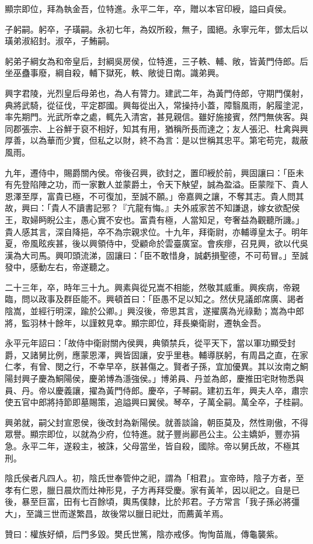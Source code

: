 \begin{pinyinscope}
顯宗即位，拜為執金吾，位特進。永平二年，卒，贈以本官印綬，謚曰貞侯。

子躬嗣。躬卒，子璜嗣。永初七年，為奴所殺，無子，國絕。永寧元年，鄧太后以璜弟淑紹封。淑卒，子鮪嗣。

躬弟子綱女為和帝皇后，封綱吳房侯，位特進，三子軼、輔、敞，皆黃門侍郎。后坐巫蠱事廢，綱自殺，輔下獄死，軼、敞徙日南。識弟興。

興字君陵，光烈皇后母弟也，為人有膂力。建武二年，為黃門侍郎，守期門僕射，典將武騎，從征伐，平定郡國。興每從出入，常操持小蓋，障翳風雨，躬履塗泥，率先期門。光武所幸之處，輒先入清宮，甚見親信。雖好施接賓，然門無俠客。與同郡張宗、上谷鮮于裒不相好，知其有用，猶稱所長而達之；友人張汜、杜禽與興厚善，以為華而少實，但私之以財，終不為言：是以世稱其忠平。第宅苟完，裁蔽風雨。

九年，遷侍中，賜爵關內侯。帝後召興，欲封之，置印綬於前，興固讓曰：「臣未有先登陷陣之功，而一家數人並蒙爵土，令天下觖望，誠為盈溢。臣蒙陛下、貴人恩澤至厚，富貴已極，不可復加，至誠不願。」帝嘉興之讓，不奪其志。貴人問其故，興曰：「貴人不讀書記邪？『亢龍有悔。』夫外戚家苦不知謙退，嫁女欲配侯王，取婦眄睨公主，愚心實不安也。富貴有極，人當知足，夸奢益為觀聽所譏。」貴人感其言，深自降挹，卒不為宗親求位。十九年，拜衛尉，亦輔導皇太子。明年夏，帝風眩疾甚，後以興領侍中，受顧命於雲臺廣室。會疾瘳，召見興，欲以代吳漢為大司馬。興叩頭流涕，固讓曰：「臣不敢惜身，誠虧損聖德，不可苟冒。」至誠發中，感動左右，帝遂聽之。

二十三年，卒，時年三十九。興素與從兄嵩不相能，然敬其威重。興疾病，帝親臨，問以政事及群臣能不。興頓首曰：「臣愚不足以知之。然伏見議郎席廣、謁者陰嵩，並經行明深，踰於公卿。」興沒後，帝思其言，遂擢廣為光祿勳；嵩為中郎將，監羽林十餘年，以謹敕見幸。顯宗即位，拜長樂衛尉，遷執金吾。

永平元年詔曰：「故侍中衛尉關內侯興，典領禁兵，從平天下，當以軍功顯受封爵，又諸舅比例，應蒙恩澤，興皆固讓，安乎里巷。輔導朕躬，有周昌之直，在家仁孝，有曾、閔之行，不幸早卒，朕甚傷之。賢者子孫，宜加優異。其以汝南之鮦陽封興子慶為鮦陽侯，慶弟博為濦強侯。」博弟員、丹並為郎，慶推田宅財物悉與員、丹。帝以慶義讓，擢為黃門侍郎。慶卒，子琴嗣。建初五年，興夫人卒，肅宗使五官中郎將持節即墓賜策，追謚興曰翼侯。琴卒，子萬全嗣。萬全卒，子桂嗣。

興弟就，嗣父封宣恩侯，後改封為新陽侯。就善談論，朝臣莫及，然性剛傲，不得眾譽。顯宗即位，以就為少府，位特進。就子豐尚酈邑公主。公主嬌妒，豐亦狷急。永平二年，遂殺主，被誅，父母當坐，皆自殺，國除。帝以舅氏故，不極其刑。

陰氏侯者凡四人。初，陰氏世奉管仲之祀，謂為「相君」。宣帝時，陰子方者，至孝有仁恩，臘日晨炊而灶神形見，子方再拜受慶。家有黃羊，因以祀之。自是已後，暴至巨富，田有七百餘頃，輿馬僕隸，比於邦君。子方常言「我子孫必將彊大」，至識三世而遂繁昌，故後常以臘日祀灶，而薦黃羊焉。

贊曰：權族好傾，后門多毀。樊氏世篤，陰亦戒侈。恂恂苗胤，傳龜襲紫。


\end{pinyinscope}